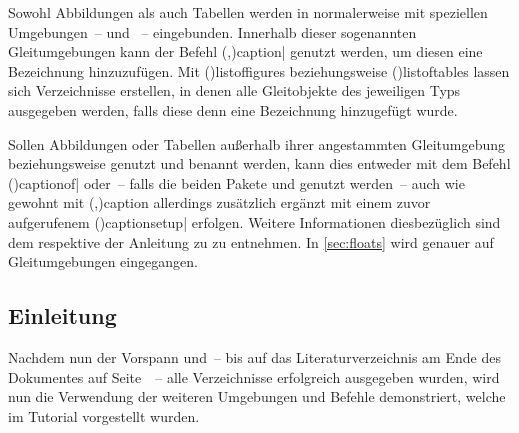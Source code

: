 \documentclass[%
  english,ngerman,%
  cdgeometry=no,DIV=12,%
  cd=false,cdfont=false,cdtitle=true,%
  headings=normal,%
  automark,%
  listof=toc,%
]{tudscrartcl}
\begin{document}
Sowohl Abbildungen als auch Tabellen werden in  normalerweise 
mit speziellen Umgebungen~--  und ~-- 
eingebunden. Innerhalb dieser sogenannten Gleitumgebungen kann der Befehl 
\Macro(,){caption|%
  }
genutzt werden, um diesen eine Bezeichnung hinzuzufügen. Mit 
\Macro(){listoffigures} beziehungsweise 
\Macro(){listoftables} lassen sich Verzeichnisse erstellen, 
in denen alle Gleitobjekte des jeweiligen Typs ausgegeben werden, falls diese 
denn eine Bezeichnung hinzugefügt wurde. 

Sollen Abbildungen oder Tabellen außerhalb ihrer angestammten Gleitumgebung 
 beziehungsweise  genutzt und benannt 
werden, kann dies entweder mit dem Befehl 
\Macro(){captionof|%
  }
oder~-- falls die beiden Pakete  und  
genutzt werden~-- auch wie gewohnt mit 
\Macro(,){caption} allerdings zusätzlich 
ergänzt mit einem zuvor aufgerufenem 
\Macro(){captionsetup|} 
erfolgen. Weitere Informationen diesbezüglich sind dem \scrguide respektive der 
Anleitung zu  zu entnehmen. In \autoref{sec:floats} wird 
genauer auf Gleitumgebungen eingegangen.
%
\begin{Trunk}
\tableofcontents
\listoffigures
\listoftables

\end{Trunk}
\begin{Trunk+}
\printacronyms[style=acrotabu]
\printsymbols[style=symblongtabu]

\chapter{Einleitung}

Nachdem nun der Vorspann und~-- bis auf das Literaturverzeichnis am 
Ende des Dokumentes auf Seite~\pageref{sec:bibliography}~-- alle 
Verzeichnisse erfolgreich ausgegeben wurden, wird nun die Verwendung 
der weiteren Umgebungen und Befehle demonstriert, welche im Tutorial 
 vorgestellt wurden.

\end{Trunk+}
\end{document}
